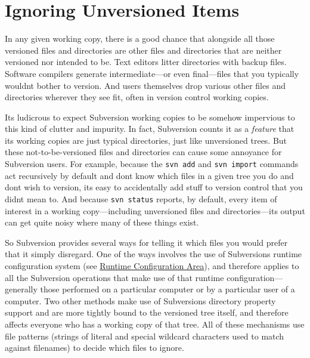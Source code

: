 \section{Ignoring Unversioned
Items}\label{svn.advanced.props.special.ignore}

In any given working copy, there is a good chance that alongside all
those versioned files and directories are other files and directories
that are neither versioned nor intended to be. Text editors litter
directories with backup files. Software compilers generate
intermediate---or even final---files that you typically
wouldn\textquotesingle t bother to version. And users themselves drop
various other files and directories wherever they see fit, often in
version control working copies.

It\textquotesingle s ludicrous to expect Subversion working copies to be
somehow impervious to this kind of clutter and impurity. In fact,
Subversion counts it as a \emph{feature} that its working copies are
just typical directories, just like unversioned trees. But these
not-to-be-versioned files and directories can cause some annoyance for
Subversion users. For example, because the \texttt{svn\ add} and
\texttt{svn\ import} commands act recursively by default and
don\textquotesingle t know which files in a given tree you do and
don\textquotesingle t wish to version, it\textquotesingle s easy to
accidentally add stuff to version control that you
didn\textquotesingle t mean to. And because \texttt{svn\ status}
reports, by default, every item of interest in a working
copy---including unversioned files and directories---its output can get
quite noisy where many of these things exist.

So Subversion provides several ways for telling it which files you would
prefer that it simply disregard. One of the ways involves the use of
Subversion\textquotesingle s runtime configuration system (see
\hyperref[svn.advanced.confarea]{Runtime Configuration Area}), and
therefore applies to all the Subversion operations that make use of that
runtime configuration---generally those performed on a particular
computer or by a particular user of a computer. Two other methods make
use of Subversion\textquotesingle s directory property support and are
more tightly bound to the versioned tree itself, and therefore affects
everyone who has a working copy of that tree. All of these mechanisms
use file patterns (strings of literal and special wildcard characters
used to match against filenames) to decide which files to ignore.

